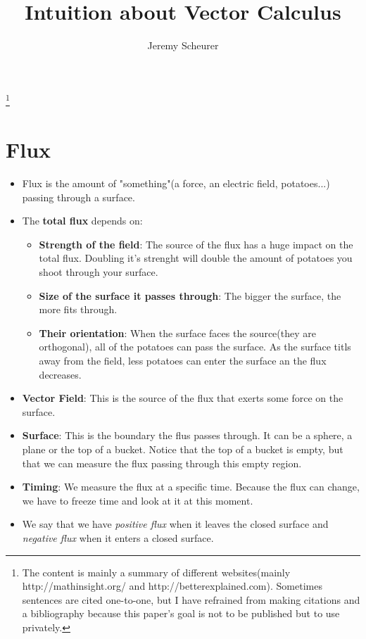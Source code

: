 \documentclass[12pt,a4paper]{article}
\author{Jeremy Scheurer}
\title{Intuition about Vector Calculus}
\begin{document}
	\maketitle
	\tableofcontents
	\let\thefootnote\relax\footnote{The content is mainly a summary of different websites(mainly http://mathinsight.org/ and http://betterexplained.com). Sometimes sentences are cited one-to-one, but I have refrained from making citations and a bibliography because this paper's goal is not to be published but to use privately.}
	\newpage
	
	\section{Flux}
		\begin{itemize}
		\item Flux is the amount of "something"(a force, an electric field, potatoes...) passing through a surface. 
		\item The \textbf{total flux} depends on:
			\begin{itemize}	
				\item \textbf{Strength of the field}: The source of the flux has a huge impact on the total flux. Doubling it's strenght will double the amount of potatoes you shoot through your surface.
				\item \textbf{Size of the surface it passes through}: The bigger the surface, the more fits through.
				\item \textbf{Their orientation}: When the surface faces the source(they are orthogonal), all of the potatoes can pass the surface. As the surface titls away from the field, less potatoes can enter the surface an the flux decreases. 
			\end{itemize}
		
		\item \textbf{Vector Field}: This is the source of the flux that exerts some force on the surface. 
		
		\item \textbf{Surface}: This is the boundary the flus passes through. It can be a sphere, a plane or the top of a bucket. Notice that the top of a bucket is empty, but that we can measure the flux passing through this empty region.
		
		\item \textbf{Timing}: We measure the flux at a specific time. Because the flux can change, we have to freeze time and look at it at this moment. 
		
		\item We say that we have \textit{positive flux} when it leaves the closed surface and \textit{negative flux} when it enters a closed surface.
		

\end{itemize}
\end{document}
